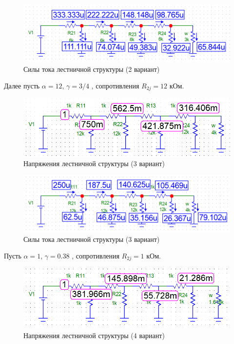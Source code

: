 \documentclass[a4paper, 12pt]{article} %
\begin{document}
\begin{figure}[h!]
    \centering
    \includegraphics[width = 12 cm]{7.png}
    \caption{Силы тока лестничной структуры (2 вариант)}
    \label{fig:vac}
\end{figure}

Далее пусть $\alpha = 12$, $\gamma = 3/4$ , сопротивления $R_{2j} = 12$ кОм.

\begin{figure}[h!]
    \centering
    \includegraphics[width = 12 cm]{8.png}
    \caption{Напряжения лестничной структуры (3 вариант)}
    \label{fig:vac}
\end{figure}

\begin{figure}[h!]
    \centering
    \includegraphics[width = 12 cm]{9.png}
    \caption{Силы тока лестничной структуры (3 вариант)}
    \label{fig:vac}
\end{figure}

Пусть $\alpha = 1$, $\gamma = 0.38$ , сопротивления $R_{2j} = 1$ кОм.

\begin{figure}[h!]
    \centering
    \includegraphics[width = 12 cm]{10.png}
    \caption{Напряжения лестничной структуры (4 вариант)}
    \label{fig:vac}
\end{figure}
\end{document}
